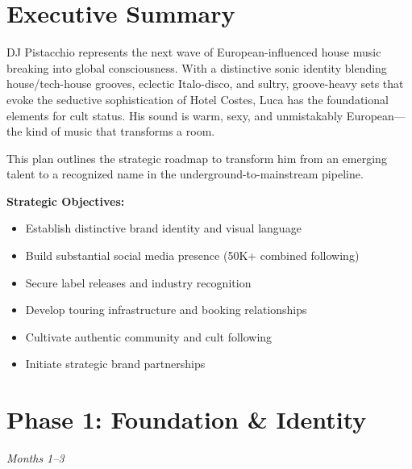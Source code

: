 \documentclass[11pt,a4paper]{article}
\begin{document}
\tableofcontents
\thispagestyle{empty}
\newpage
\setcounter{page}{1}

\section{Executive Summary}

\begin{executivebox}
DJ Pistacchio represents the next wave of European-influenced house music breaking into global consciousness. With a distinctive sonic identity blending house/tech-house grooves, eclectic Italo-disco, and sultry, groove-heavy sets that evoke the seductive sophistication of Hotel Costes, Luca has the foundational elements for cult status. His sound is warm, sexy, and unmistakably European---the kind of music that transforms a room.

\vspace{0.5em}

This plan outlines the strategic roadmap to transform him from an emerging talent to a recognized name in the underground-to-mainstream pipeline.
\end{executivebox}

\vspace{1em}

\noindent\textbf{Strategic Objectives:}
\begin{itemize}[leftmargin=*]
    \item Establish distinctive brand identity and visual language
    \item Build substantial social media presence (50K+ combined following)
    \item Secure label releases and industry recognition
    \item Develop touring infrastructure and booking relationships
    \item Cultivate authentic community and cult following
    \item Initiate strategic brand partnerships
\end{itemize}

\section{Phase 1: Foundation \& Identity}
\textit{Months 1--3}
\end{document}
